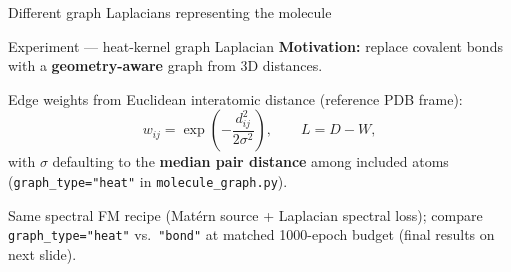 \documentclass[aspectratio=169,11pt]{beamer}
\begin{document}
\begin{frame}
  \centering
  {\LARGE Different graph Laplacians representing the molecule}
\end{frame}

\begin{frame}{Experiment --- heat-kernel graph Laplacian}
  \textbf{Motivation:} replace covalent bonds with a \textbf{geometry-aware} graph from 3D distances.

  \vspace{0.5em}
  Edge weights from Euclidean interatomic distance (reference PDB frame):
  \[
    w_{ij} = \exp\!\left(-\frac{d_{ij}^2}{2\sigma^2}\right),
    \qquad
    L = D - W,
  \]
  with $\sigma$ defaulting to the \textbf{median pair distance} among included atoms (\texttt{graph\_type="heat"} in \texttt{molecule\_graph.py}).

  \vspace{0.4em}
  Same spectral FM recipe (Mat\'ern source + Laplacian spectral loss); compare \texttt{graph\_type="heat"} vs.\ \texttt{"bond"} at matched 1000-epoch budget (final results on next slide).
\end{frame}
\end{document}
